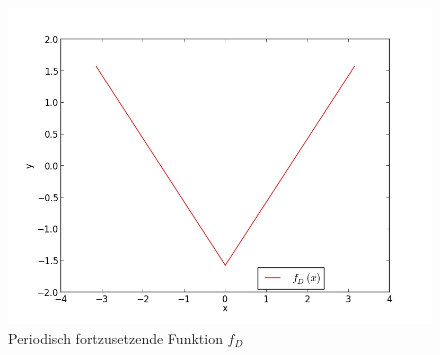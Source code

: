 	\begin{figure}[h]
		\begin{center}
		\includegraphics[scale=0.42]{picfdrei.jpg}
		\caption{Periodisch fortzusetzende Funktion $f_D$}
		\label{picfdrei}
		\end{center}	
	\end{figure}
